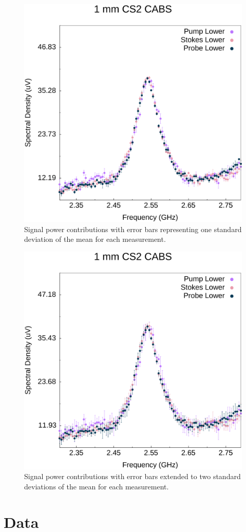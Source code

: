\begin{figure}[ht]
  \centering
  \includegraphics[width=\textwidth]{figs/3-CoBS/PSPr-Contribute-Equally.pdf}
  \caption{Signal power contributions with error bars representing one standard deviation of the mean for each measurement.}
  \label{fig:PSPr-Contribute-Equally}
\end{figure}

\begin{figure}[ht]
  \centering
  \includegraphics[width=\textwidth]{figs/3-CoBS/PSPr-Contribute-Equally-2sigma.pdf}
  \caption{Signal power contributions with error bars extended to two standard deviations of the mean for each measurement.}
  \label{fig:PSPr-Contribute-Equally-2sigma}
\end{figure}

\FloatBarrier

\newpage

\section{Data}
